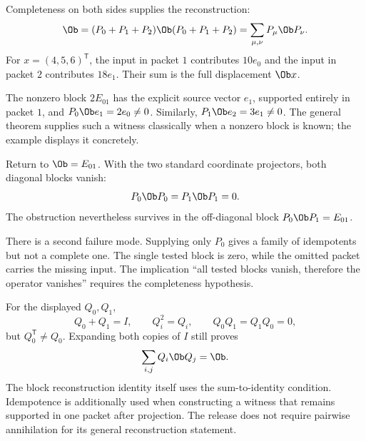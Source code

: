 
Completeness on both sides supplies the reconstruction:
\[
\Ob=(P_0+P_1+P_2)\Ob(P_0+P_1+P_2)
=\sum_{\mu,\nu}P_\mu\Ob P_\nu.
\]
For $x=(4,5,6)^\mathsf T$, the input in packet $1$ contributes $10e_0$ and the input in packet $2$ contributes $18e_1$. Their sum is the full displacement $\Ob x$.

The nonzero block $2E_{01}$ has the explicit source vector $e_1$, supported entirely in packet $1$, and $P_0\Ob e_1=2e_0\ne0$. Similarly, $P_1\Ob e_2=3e_1\ne0$. The general theorem supplies such a witness classically when a nonzero block is known; the example displays it concretely.


Return to $\Ob=E_{01}$. With the two standard coordinate projectors, both diagonal blocks vanish:
\[
P_0\Ob P_0=P_1\Ob P_1=0.
\]
The obstruction nevertheless survives in the off-diagonal block $P_0\Ob P_1=E_{01}$.


There is a second failure mode. Supplying only $P_0$ gives a family of idempotents but not a complete one. The single tested block is zero, while the omitted packet carries the missing input. The implication ``all tested blocks vanish, therefore the operator vanishes'' requires the completeness hypothesis.

For the displayed $Q_0,Q_1$,
\[
Q_0+Q_1=I,\qquad Q_i^2=Q_i,\qquad Q_0Q_1=Q_1Q_0=0,
\]
but $Q_0^\mathsf T\ne Q_0$. Expanding both copies of $I$ still proves
\[
\sum_{i,j}Q_i\Ob Q_j=\Ob.
\]
The block reconstruction identity itself uses the sum-to-identity condition. Idempotence is additionally used when constructing a witness that remains supported in one packet after projection. The release does not require pairwise annihilation for its general reconstruction statement.

